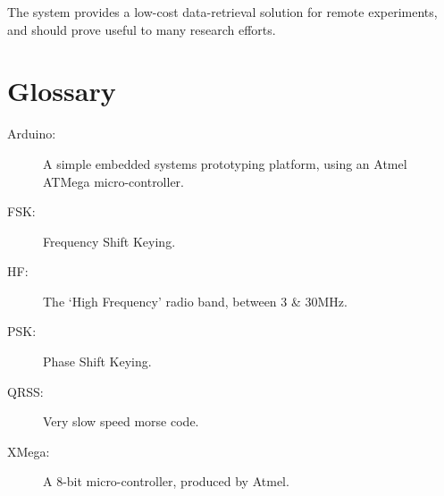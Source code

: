 \documentclass[a4paper,12pt]{article}
\begin{document}
The system provides a low-cost data-retrieval solution for remote experiments, and should prove useful to many research efforts.


\newpage
\section*{Glossary}
\begin{description}
\item[Arduino:] A simple embedded systems prototyping platform, using an Atmel ATMega micro-controller.
\item[FSK:] Frequency Shift Keying.
\item[HF:] The `High Frequency' radio band, between 3 \& 30MHz.
\item[PSK:] Phase Shift Keying.
\item[QRSS:] Very slow speed morse code.
\item[XMega:] A 8-bit micro-controller, produced by Atmel.
\end{description}
\end{document}
